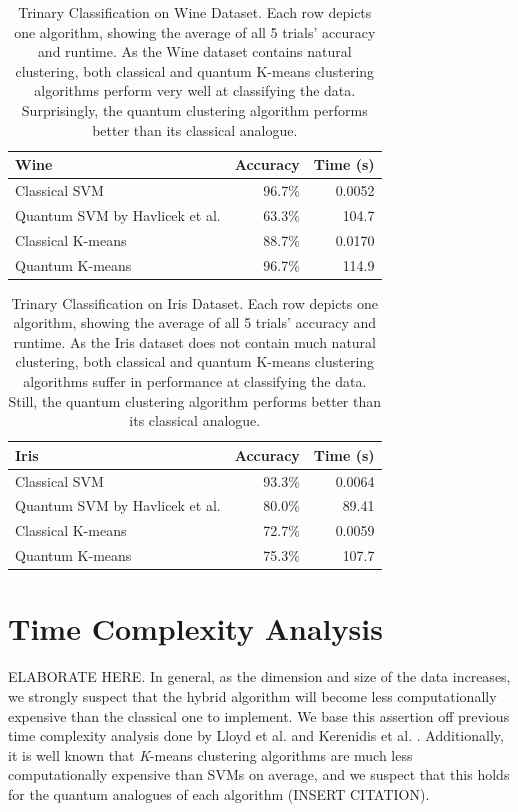 \documentclass[twocolumn, english]{revtex4-2}
\begin{document}
\begin{table}
\begin{tabular}{l|r|r}
Wine&Accuracy&Time (s)\\
\hline
Classical SVM&96.7\%&0.0052\\
\hline
Quantum SVM by Havlicek et al.&63.3\%&104.7\\
\hline
Classical K-means&88.7\%&0.0170\\
\hline
Quantum K-means&96.7\%&114.9\\
\hline
\end{tabular}
\caption{Trinary Classification on Wine Dataset. Each row depicts one algorithm, showing the average of all 5 trials' accuracy and runtime. As the Wine dataset contains natural clustering, both classical and quantum K-means clustering algorithms perform very well at classifying the data. Surprisingly, the quantum clustering algorithm performs better than its classical analogue. }
\end{table}
\begin{table}
\begin{tabular}{|l|r|r}
Iris&Accuracy&Time (s)\\
\hline
Classical SVM&93.3\%&0.0064\\
\hline
Quantum SVM by Havlicek et al.&80.0\%&89.41\\
\hline
Classical K-means&72.7\%&0.0059\\
\hline
Quantum K-means&75.3\%&107.7\\
\hline
\end{tabular}
\caption{Trinary Classification on Iris Dataset. Each row depicts one algorithm, showing the average of all 5 trials' accuracy and runtime. As the Iris dataset does not contain much natural clustering, both classical and quantum K-means clustering algorithms suffer in performance at classifying the data. Still, the quantum clustering algorithm performs better than its classical analogue.}
\end{table}

\section{Time Complexity Analysis}
ELABORATE HERE. In general, as the dimension and size of the data increases, we strongly suspect that the hybrid algorithm will become less computationally expensive than the classical one to implement. We base this assertion off previous time complexity analysis done by Lloyd et al. \cite{lloydlearning} and Kerenidis et al. \cite{qmeans}. Additionally, it is well known that \textit{K}-means clustering algorithms are much less computationally expensive than SVMs on average, and we suspect that this holds for the quantum analogues of each algorithm (INSERT CITATION).
\end{document}
